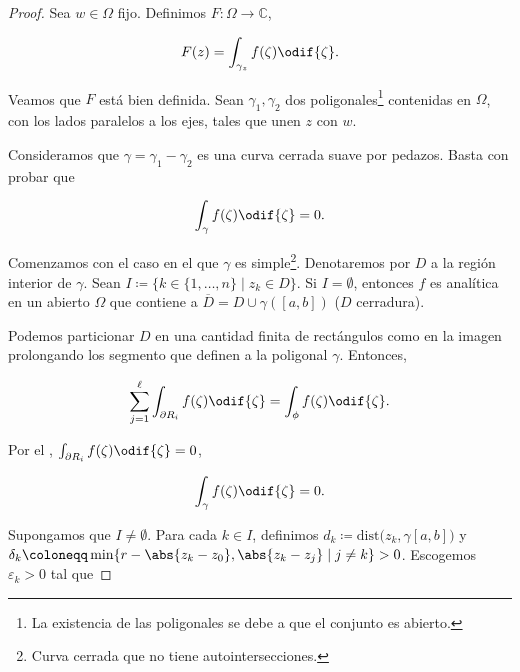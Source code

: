 \documentclass[../main.tex]{subfiles}
\begin{document}
\begin{proof}
    Sea \(w \in \Omega\) fijo. Definimos \(F \colon \Omega \to \mathbb{C}\),

    \begin{equation*}
        F(z) = \int_{\gamma_{z}}^{}f(\zeta)\odif{\zeta}.
    \end{equation*}

    Veamos que \(F\) está bien definida. Sean \(\gamma_{1}, \gamma_{2}\) dos
    poligonales\footnote{La existencia de las poligonales se debe a que el
    conjunto es abierto.}
    contenidas en \(\Omega\), con los lados paralelos a los ejes, tales que
    unen \(z\) con
    \(w\).

    Consideramos que \(\gamma = \gamma_{1} - \gamma_{2}\) es una curva cerrada suave por
    pedazos. Basta con probar que

    \begin{equation*}
        \int_{\gamma}^{}f(\zeta)\odif{\zeta} = 0.
    \end{equation*}

    Comenzamos con el caso en el que \(\gamma\) es simple\footnote{Curva cerrada que no
    tiene autointersecciones.}. Denotaremos por \(D\) a la región interior de
    \(\gamma\).
    Sean \(I \coloneqq \{k\in \{1, \dots, n\} \mid z_{k}\in D\}\). Si \(I = \emptyset\),
    entonces \(f\) es analítica en un abierto \(\Omega\) que contiene a \(\overline{D} =
    D \cup \gamma([a, b])\) (\(D\) cerradura).

    Podemos particionar \(D\) en una cantidad finita de rectángulos como en la imagen
    prolongando los segmento que definen a la poligonal \(\gamma\). Entonces,

    \begin{equation}
        \sum_{j = 1}^{\ell} \int_{\partial R_{i}}^{}f(\zeta)\odif{\zeta} =
        \int_{\phi}^{}f(\zeta)\odif{\zeta}.
    \end{equation}

    Por el , \(\int_{\partial
    R_{i}}^{}f(\zeta)\odif{\zeta} = 0\),

    \begin{equation*}
        \int_{\gamma}^{}f(\zeta)\odif{\zeta} = 0.
    \end{equation*}

    Supongamos que \(I \neq \emptyset\). Para cada \(k \in I\), definimos
    \(d_{k} \coloneqq
    \mathrm{dist}\bigl(z_{k}, \gamma[a, b]\bigr)\) y \(\delta_{k} \coloneqq \min\{r -
    \abs{z_{k} - z_{0}}, \abs{ z_{k} - z_{j}} \mid j \neq k\} > 0\). Escogemos
    \(\varepsilon_{k} > 0\) tal que


\end{proof}
\end{document}
